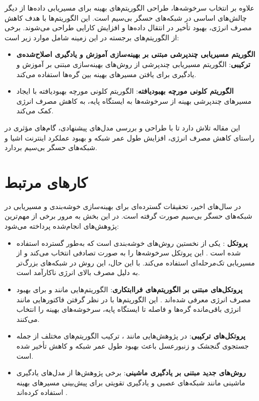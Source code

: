 \documentclass[12pt, onecolumn, a4paper]{article}
\begin{document}
	علاوه بر انتخاب سرخوشه‌ها، طراحی الگوریتم‌های بهینه برای مسیریابی داده‌ها از دیگر چالش‌های اساسی در شبکه‌های حسگر بی‌سیم است. این الگوریتم‌ها با هدف کاهش مصرف انرژی، بهبود تأخیر در انتقال داده‌ها و افزایش کارایی طراحی می‌شوند. برخی از الگوریتم‌های برجسته در این زمینه شامل موارد زیر است:
	
	\begin{itemize}
		\item \textbf{الگوریتم مسیریابی چندپرشی مبتنی بر بهینه‌سازی آموزش و یادگیری اصلاح‌شده‌ی ترکیبی}: الگوریتم مسیریابی چندپرشی از روش‌های بهینه‌سازی مبتنی بر آموزش و یادگیری برای یافتن مسیرهای بهینه بین گره‌ها استفاده می‌کند.
		\item \textbf{الگوریتم کلونی مورچه بهبودیافته}: الگوریتم کلونی مورچه بهبودیافته با ایجاد مسیرهای چندپرشی بهینه از سرخوشه‌ها به ایستگاه پایه، به کاهش مصرف انرژی کمک می‌کند.
	\end{itemize}
	
	این مقاله تلاش دارد تا با طراحی و بررسی مدل‌های پیشنهادی، گام‌های مؤثری در راستای کاهش مصرف انرژی، افزایش طول عمر شبکه و بهبود عملکرد اینترنت اشیا و شبکه‌های حسگر بی‌سیم بردارد.
	
	
\section{کارهای مرتبط}

در سال‌های اخیر، تحقیقات گسترده‌ای برای بهینه‌سازی خوشه‌بندی و مسیریابی در شبکه‌های حسگر بی‌سیم صورت گرفته است. در این بخش به مرور برخی از مهم‌ترین پژوهش‌های انجام‌شده پرداخته می‌شود:

\begin{itemize}
	\item \textbf{پروتکل }: یکی از نخستین روش‌های خوشه‌بندی است که به‌طور گسترده استفاده شده است \cite{ref1, ref5}. این پروتکل سرخوشه‌ها را به صورت تصادفی انتخاب می‌کند و از مسیریابی تک‌مرحله‌ای استفاده می‌کند. با این حال، این روش در شبکه‌های بزرگ‌تر به دلیل مصرف بالای انرژی ناکارآمد است.
	
	\item \textbf{پروتکل‌های مبتنی بر الگوریتم‌های فراابتکاری}: الگوریتم‌هایی مانند  و  برای بهبود مصرف انرژی معرفی شده‌اند \cite{ref4, ref6}. این الگوریتم‌ها با در نظر گرفتن فاکتورهایی مانند انرژی باقی‌مانده گره‌ها و فاصله تا ایستگاه پایه، سرخوشه‌های بهینه را انتخاب می‌کنند.
	
	\item \textbf{پروتکل‌های ترکیبی}: در پژوهش‌هایی مانند \cite{ref5, ref7}، ترکیب الگوریتم‌های مختلف از جمله جستجوی گنجشک و زنبورعسل باعث بهبود طول عمر شبکه و کاهش تأخیر شده است.
	
	\item \textbf{روش‌های جدید مبتنی بر یادگیری ماشینی}: برخی پژوهش‌ها از مدل‌های یادگیری ماشینی مانند شبکه‌های عصبی و یادگیری تقویتی برای پیش‌بینی مسیرهای بهینه استفاده کرده‌اند \cite{ref8, ref9}.
\end{itemize}
\end{document}
